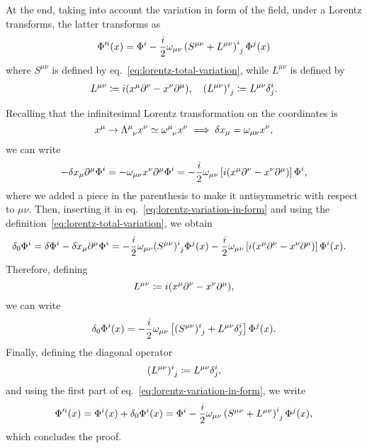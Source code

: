 At the end, taking into account the variation in form of the field, under a Lorentz transforms, the latter transforms as
\begin{equation}\label{eq:total-lorentz-variation}
    \Phi'^i(x) = \Phi^i - \frac{i}{2} \omega_{\mu\nu} \tensor{\left(S^{\mu\nu} + L^{\mu\nu}\right)}{^i_j} \Phi^j (x)
\end{equation}
where ${S}^{\mu\nu}$ is defined by eq.~\eqref{eq:lorentz-total-variation}, while ${L}^{\mu\nu}$ is defined by
\begin{equation}
    {{L}}^{\mu\nu} \coloneq i (x^\mu \de^\nu - x^\nu \de^\mu), \quad  \tensor{(L^{\mu\nu})}{^i_j} \coloneq L^{\mu\nu} \delta^i_j.
\end{equation}

\begin{mdframed}
\begin{innerproof}
    Recalling that the infinitesimal Lorentz transformation on the coordinates is
    \begin{equation*}
        x^\mu \to \tensor{\Lambda}{^\mu_\nu}x^\nu \simeq \tensor{\omega}{^\mu_\nu}x^\nu \implies \delta x_\mu = \omega_{\mu\nu}x^\nu ,
    \end{equation*}
    we can write
    \begin{equation*}
        -\delta x_\mu \partial^\mu \Phi^i = - \omega_{\mu\nu} x^\nu \partial^\mu \Phi^i = -\frac{i}{2} \omega_{\mu\nu} \left[ i (x^\mu \partial^\nu - x^\nu \partial^\mu) \right] \Phi^i ,
    \end{equation*}
    where we added a piece in the parenthesis to make it antisymmetric with respect to $\mu\nu$. Then, inserting it in eq.~\eqref{eq:lorentz-variation-in-form} and using the definition~\eqref{eq:lorentz-total-variation}, we obtain
    \begin{align*}
        \delta_0 \Phi^i = \delta \Phi^i - \delta x_\mu \de^\mu \Phi^i &= -\frac{i}{2} \omega_{\mu\nu} \tensor{(S^{\mu\nu})}{^i_j} \Phi^j(x) -\frac{i}{2} \omega_{\mu\nu} \left[ i (x^\mu \de^\nu - x^\nu \de^\mu) \right] \Phi^i (x).
    \end{align*}
    Therefore, defining
    \begin{equation*}
        {{L}}^{\mu\nu} \coloneq i (x^\mu \partial^\nu - x^\nu \partial^\mu) ,
    \end{equation*}
    we can write
    \begin{equation*}
        \delta_0 \Phi^i (x) = -\frac{i}{2} \omega_{\mu\nu} \left[ \tensor{(S^{\mu\nu})}{^i_j} + L^{\mu\nu} \delta^i_j \right] \Phi^j (x).
    \end{equation*}
    Finally, defining the diagonal operator 
    \begin{equation*}
        \tensor{(L^{\mu\nu})}{^i_j} \coloneq L^{\mu\nu} \delta^i_j,
    \end{equation*}
    and using the first part of eq.~\eqref{eq:lorentz-variation-in-form}, we write
    \begin{equation*}
        \Phi'^i(x) = \Phi^i(x) + \delta_0 \Phi^i (x) = \Phi^i - \frac{i}{2} \omega_{\mu\nu} \tensor{\left(S^{\mu\nu} + L^{\mu\nu}\right)}{^i_j} \Phi^j (x),
    \end{equation*}
    which concludes the proof.
\end{innerproof}
\end{mdframed}
